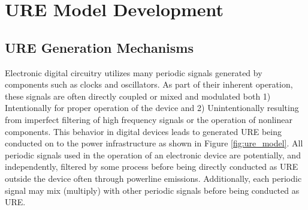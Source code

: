 \chapter{URE Model Development} 
\label{URE Model Development Chapter}

\section[URE Generation Mechanisms]{URE Generation Mechanisms}

Electronic digital circuitry utilizes many periodic signals generated by components such as clocks and oscillators. As part of their inherent operation, these signals are often directly coupled or mixed and modulated both 1) Intentionally for proper operation of the device and 2) Unintentionally resulting from imperfect filtering of high frequency signals or the operation of nonlinear components. This behavior in digital devices leads to generated URE being conducted on to the power infrastructure as shown in Figure \ref{fig:ure_model}. All periodic signals used in the operation of an electronic device are potentially, and independently, filtered by some process before being directly conducted as URE outside the device often through powerline emissions.  Additionally, each periodic signal may mix (multiply) with other periodic signals before being conducted as URE.

